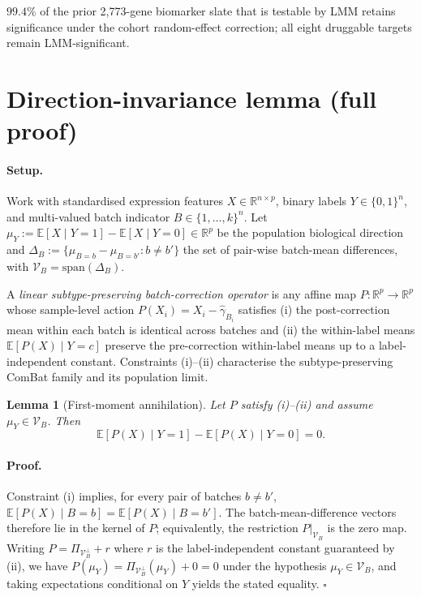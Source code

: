 \documentclass[11pt,a4paper]{article}
\newtheorem{lemma}{Lemma}
\begin{document}
$99.4\%$ of the prior 2{,}773-gene biomarker slate that is testable
by LMM retains significance under the cohort random-effect correction;
all eight druggable targets remain LMM-significant.

\section{Direction-invariance lemma (full proof)}
\label{sec:S8}

\paragraph{Setup.} Work with standardised expression features
$X \in \mathbb{R}^{n \times p}$, binary labels
$Y \in \{0,1\}^n$, and multi-valued batch indicator
$B \in \{1,\ldots,k\}^n$. Let $\mu_Y := \mathbb{E}[X \mid Y = 1] -
\mathbb{E}[X \mid Y = 0] \in \mathbb{R}^p$ be the population
biological direction and $\Delta_B := \{\mu_{B=b} - \mu_{B=b'} :
b \neq b'\}$ the set of pair-wise batch-mean differences, with
$\mathcal{V}_B = \mathrm{span}(\Delta_B)$.

A \emph{linear subtype-preserving batch-correction operator} is any
affine map $P : \mathbb{R}^p \to \mathbb{R}^p$ whose sample-level
action $P(X_i) = X_i - \hat\gamma_{B_i}$ satisfies (i) the
post-correction mean within each batch is identical across batches and
(ii) the within-label means $\mathbb{E}[P(X) \mid Y = c]$ preserve the
pre-correction within-label means up to a label-independent constant.
Constraints (i)--(ii) characterise the subtype-preserving ComBat
family \citep{johnson2007combat} and its population limit.

\begin{lemma}[First-moment annihilation]
\label{lem:main}
Let $P$ satisfy (i)--(ii) and assume $\mu_Y \in \mathcal{V}_B$. Then
\[
  \mathbb{E}[P(X) \mid Y = 1] - \mathbb{E}[P(X) \mid Y = 0] = 0.
\]
\end{lemma}

\paragraph{Proof.} Constraint (i) implies, for every pair of batches
$b \neq b'$,
$\mathbb{E}[P(X) \mid B = b] = \mathbb{E}[P(X) \mid B = b']$. The
batch-mean-difference vectors therefore lie in the kernel of $P$;
equivalently, the restriction $P|_{\mathcal{V}_B}$ is the zero map.
Writing $P = \Pi_{\mathcal{V}_B^\perp} + r$ where $r$ is the
label-independent constant guaranteed by (ii), we have
$P(\mu_Y) = \Pi_{\mathcal{V}_B^\perp}(\mu_Y) + 0 = 0$ under the
hypothesis $\mu_Y \in \mathcal{V}_B$, and taking expectations
conditional on $Y$ yields the stated equality. $\square$
\end{document}
